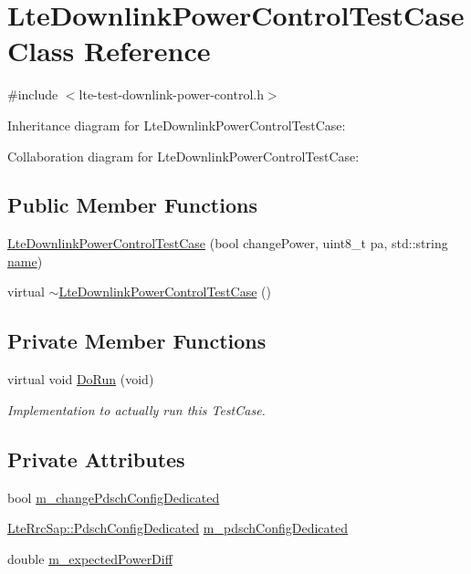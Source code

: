 \hypertarget{classLteDownlinkPowerControlTestCase}{}\section{Lte\+Downlink\+Power\+Control\+Test\+Case Class Reference}
\label{classLteDownlinkPowerControlTestCase}


{\ttfamily \#include $<$lte-\/test-\/downlink-\/power-\/control.\+h$>$}



Inheritance diagram for Lte\+Downlink\+Power\+Control\+Test\+Case\+:


Collaboration diagram for Lte\+Downlink\+Power\+Control\+Test\+Case\+:
\subsection*{Public Member Functions}
\begin{DoxyCompactItemize}
\item 
\hyperlink{classLteDownlinkPowerControlTestCase_a6aaeba86d236f4e9848a3414d6ff087a}{Lte\+Downlink\+Power\+Control\+Test\+Case} (bool change\+Power, uint8\+\_\+t pa, std\+::string \hyperlink{generate__test__data__lte__spectrum__model_8m_ab74e6bf80237ddc4109968cedc58c151}{name})
\item 
virtual \hyperlink{classLteDownlinkPowerControlTestCase_ad1e870845f4fb9737cfc32fd0fb2b480}{$\sim$\+Lte\+Downlink\+Power\+Control\+Test\+Case} ()
\end{DoxyCompactItemize}
\subsection*{Private Member Functions}
\begin{DoxyCompactItemize}
\item 
virtual void \hyperlink{classLteDownlinkPowerControlTestCase_a2eb1e31f7313f51061d8aa950d3f4268}{Do\+Run} (void)
\begin{DoxyCompactList}\small\item\em Implementation to actually run this Test\+Case. \end{DoxyCompactList}\end{DoxyCompactItemize}
\subsection*{Private Attributes}
\begin{DoxyCompactItemize}
\item 
bool \hyperlink{classLteDownlinkPowerControlTestCase_ad637612640933b4257b61f515ae44186}{m\+\_\+change\+Pdsch\+Config\+Dedicated}
\item 
\hyperlink{structns3_1_1LteRrcSap_1_1PdschConfigDedicated}{Lte\+Rrc\+Sap\+::\+Pdsch\+Config\+Dedicated} \hyperlink{classLteDownlinkPowerControlTestCase_a585b94172221a43077e191eb81bf72e2}{m\+\_\+pdsch\+Config\+Dedicated}
\item 
double \hyperlink{classLteDownlinkPowerControlTestCase_a02131214e45a4ecd49f1a8d3b9b65675}{m\+\_\+expected\+Power\+Diff}
\end{DoxyCompactItemize}
